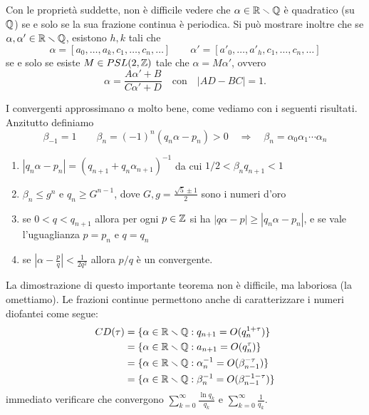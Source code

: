 \begin{esempio}
 Con le propriet\`a suddette, non \`e difficile vedere che $\alpha\in\irr$ \`e quadratico (su $\mathbb{Q}$) se e solo se la sua frazione continua  \`e periodica. 
 Si pu\`o mostrare inoltre che se $\alpha,\alpha'\in\mathbb{R}\smallsetminus\mathbb{Q}$, esistono $h,k$ tali che
 \[\alpha=[a_0,\dots,a_k,c_1,\dots,c_n,\dots] \qquad \alpha'=[a'_0,\dots,a'_h,c_1,\dots,c_n,\dots]\]
 se e solo se esiste $M\in PSL(2,\mathbb{Z})$ tale che $\alpha=M\alpha'$, ovvero 
 \[\alpha=\frac{A\alpha'+B}{C\alpha'+D}\quad \mbox{con}\quad |AD-BC|=1.\]
\end{esempio}

I convergenti approssimano $\alpha$ molto bene, come vediamo con i seguenti risultati. Anzitutto definiamo
\[\beta_{-1}=1\qquad \beta_n=(-1)^n(q_n\alpha-p_n)>0 \quad \Rightarrow \quad \beta_n=\alpha_0\alpha_1\cdots \alpha_n\]

\begin{teo}\label{miglioreappr}\begin{enumerate} Se $\alpha\in\irr$, valgono
  \item $|q_n\alpha-p_n|=(q_{n+1}+q_n\alpha_{n+1})^{-1}$ da cui $1/2<\beta_nq_{n+1}<1$
  \item $\beta_n\leq g^n$ e $q_n\geq G^{n-1}$, dove $G,g=\frac{\sqrt 5\pm 1}{2}$ sono i numeri d'oro
  \item se $0<q<q_{n+1}$ allora per ogni $p\in\mathbb{Z}$ si ha $|q\alpha-p|\geq |q_n\alpha-p_n|$, e se vale l'uguaglianza $p=p_n$ e $q=q_n$
  \item se $\left|\alpha-\frac{p}{q}\right|<\frac{1}{2q^2}$ allora $p/q$  \`e un convergente.
  \end{enumerate}\end{teo}

La dimostrazione di questo importante teorema non  \`e difficile, ma laboriosa (la omettiamo). Le frazioni continue permettono anche di caratterizzare i numeri diofantei come segue:
\[\begin{split} CD(\tau)&=\{\alpha\in\mathbb{R}\smallsetminus\mathbb{Q}:q_{n+1}=O(q_n^{1+\tau})\}\\
			&=\{\alpha\in\mathbb{R}\smallsetminus\mathbb{Q}:a_{n+1}=O(q_n^{\tau})\}\\
			&=\{\alpha\in\mathbb{R}\smallsetminus\mathbb{Q}:\alpha_n^{-1}=O(\beta_{n-1}^{-\tau})\}\\
			&=\{\alpha\in\mathbb{R}\smallsetminus\mathbb{Q}:\beta_n^{-1}=O(\beta_{n-1}^{-1-\tau})\}
\end{split}\]
\Eacc immediato verificare che convergono $\sum_{k=0}^\infty\frac{\ln q_k}{q_k}$ e $\sum_{k=0}^\infty\frac{1}{q_k}$.




